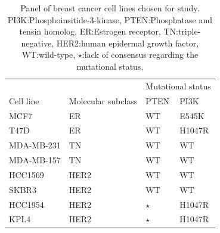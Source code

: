 \documentclass[a4paper,11pt,twoside,openright]{scrbook}
\begin{document}
\begin{table}[]
    \begin{footnotesize}
    \captionsetup{width=0.8\linewidth}
    \centering
    \caption[Panel of breast cancer cell lines chosen for study]{Panel of breast cancer cell lines chosen for study. PI3K:Phosphoinsitide-3-kinase, PTEN:Phosphatase and tensin homolog, ER:Estrogen receptor, TN:triple-negative, HER2:human epidermal growth factor, WT:wild-type, $\star$:lack of consensus regarding the mutational status.}
    \label{table:cell-lines}
    \begin{tabular}{@{}llll@{}}
    \toprule
               &                    & \multicolumn{2}{l}{Mutational status} \\
    Cell line  & Molecular subclass & PTEN             & PI3K               \\ \midrule
    MCF7       & ER                 & WT               & E545K              \\
    T47D       & ER                 & WT               & H1047R             \\
    MDA-MB-231 & TN                 & WT               & WT                 \\
    MDA-MB-157 & TN                 & WT               & WT                 \\
    HCC1569    & HER2               & WT               & WT                 \\
    SKBR3      & HER2               & WT               & WT                 \\
    HCC1954    & HER2               & $\star$          & H1047R             \\
    KPL4       & HER2               & $\star$          & H1047R             \\ \bottomrule
    \end{tabular}
    \end{footnotesize}
\end{table}
\end{document}
